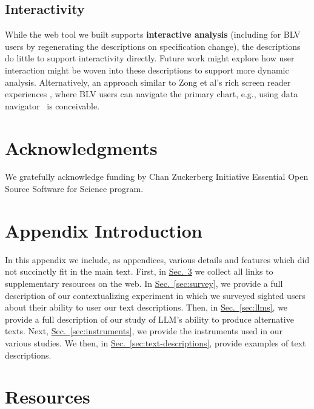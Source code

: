 \documentclass{egpubl}
\newcommand{\secref}[1]{\hyperref[#1]{Sec.~\ref*{#1}}}
\begin{document}
\subsection{Interactivity}
While the web tool we built supports \textbf{interactive analysis} (including for BLV users by regenerating the descriptions on specification change), the descriptions do little to support interactivity directly. Future work might explore how user interaction might be woven into these descriptions to support more dynamic analysis. Alternatively, an approach similar to Zong et al's rich screen reader experiences \cite{zong_rich_2022}, where BLV users can navigate the primary chart, e.g., using data navigator~\cite{elavsky_data_2024} is conceivable.

\section{Acknowledgments}

We gratefully acknowledge funding by Chan Zuckerberg Initiative Essential Open Source Software for Science program.









\clearpage
\onecolumn

\appendix

\section{Appendix Introduction}

In this appendix we include, as appendices, various details and features which did not succinctly fit in the main text.
First, in \secref{sec:resources} we collect all links to supplementary resources on the web. In \secref{sec:survey}, we provide a full description of our contextualizing experiment in which we surveyed sighted users about their ability to user our text descriptions.
Then, in \secref{sec:llms}, we provide a full description of our study of LLM's ability to produce alternative texts.
Next, \secref{sec:instruments}, we provide the instruments used in our various studies.
We then, in \secref{sec:text-descriptions}, provide examples of text descriptions.



\section{Resources}
\label{sec:resources}
\end{document}
